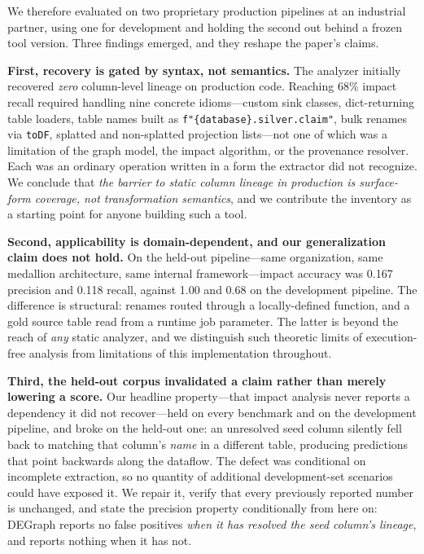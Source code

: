 \documentclass[11pt]{article}
\newcommand{\code}[1]{\texttt{#1}}
\begin{document}
We therefore evaluated on two proprietary production pipelines at an industrial
partner, using one for development and holding the second out behind a frozen tool
version. Three findings emerged, and they reshape the paper's claims.

\textbf{First, recovery is gated by syntax, not semantics.} The analyzer initially
recovered \emph{zero} column-level lineage on production code. Reaching 68\% impact
recall required handling nine concrete idioms---custom sink classes, dict-returning
table loaders, table names built as \code{f"\{database\}.\allowbreak silver.\allowbreak claim"}, bulk renames
via \code{toDF}, splatted and non-splatted projection lists---not one of which was a
limitation of the graph model, the impact algorithm, or the provenance resolver. Each
was an ordinary operation written in a form the extractor did not recognize. We
conclude that \emph{the barrier to static column lineage in production is surface-form
coverage, not transformation semantics}, and we contribute the inventory as a
starting point for anyone building such a tool.

\textbf{Second, applicability is domain-dependent, and our generalization claim does
not hold.} On the held-out pipeline---same organization, same medallion
architecture, same internal framework---impact accuracy was 0.167 precision and
0.118 recall, against 1.00 and 0.68 on the development pipeline. The difference is
structural: renames routed through a locally-defined function, and a gold source
table read from a runtime job parameter. The latter is beyond the reach of
\emph{any} static analyzer, and we distinguish such theoretic limits of
execution-free analysis from limitations of this implementation throughout.

\textbf{Third, the held-out corpus invalidated a claim rather than merely lowering a
score.} Our headline property---that impact analysis never reports a dependency it
did not recover---held on every benchmark and on the development pipeline, and broke
on the held-out one: an unresolved seed column silently fell back to matching that
column's \emph{name} in a different table, producing predictions that point backwards
along the dataflow. The defect was conditional on incomplete extraction, so no
quantity of additional development-set scenarios could have exposed it. We repair it,
verify that every previously reported number is unchanged, and state the precision
property conditionally from here on: DEGraph reports no false positives \emph{when it
has resolved the seed column's lineage}, and reports nothing when it has not.
\end{document}
